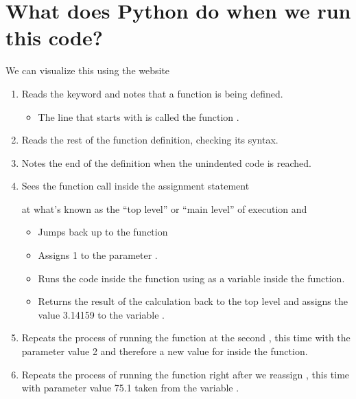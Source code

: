 \documentclass[letterpaper,10pt,english]{sphinxmanual}
\begin{document}
\section{What does Python do when we run this code?}
\label{\detokenize{lecture_notes/lec05_functions2:what-does-python-do-when-we-run-this-code}}
We can visualize this using the website 
\begin{enumerate}
\item {} 
Reads the keyword  and notes that a function is being defined.
\begin{itemize}
\item {} 
The line that starts with  is called the function .

\end{itemize}

\item {} 
Reads the rest of the function definition, checking its syntax.

\item {} 
Notes the end of the definition when the unindented code is reached.

\item {} 
Sees the function call inside the assignment statement

%
\begin{sphinxVerbatim}[commandchars=\\\{\}]
  
\end{sphinxVerbatim}

at what’s known as the “top level” or “main level” of execution
and
\begin{itemize}
\item {} 
Jumps back up to the function

\item {} 
Assigns 1 to the parameter .

\item {} 
Runs the code inside the function using  as a variable
inside the function.

\item {} 
Returns the result of the calculation back to the top level and
assigns the value 3.14159 to the variable .

\end{itemize}

\item {} 
Repeats the process of running the function at the second
, this time with the parameter value 2 and therefore a
new value for  inside the function.

\item {} 
Repeats the process of running the function right after we reassign
, this time with parameter value 75.1 taken from the variable
.

\end{enumerate}
\end{document}
